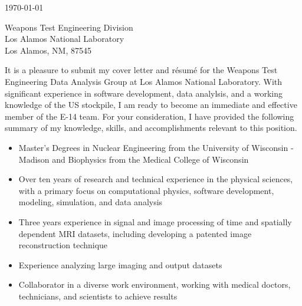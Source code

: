 
\begin{center}
\begin{minipage}{\textwidth}

  \normalsize

  \vspace{6mm} 

  \today \\
  \vspace{4mm}
	
	Weapons Test Engineering Division \\
	Los Alamos National Laboratory \\
	Los Alamos, NM, 87545 \\
  
  \vspace{4mm} 


  It is a pleasure to submit my cover letter and r\'{e}sum\'{e} for the Weapons Test Engineering Data Analysis Group at Los Alamos National Laboratory.
  With significant experience in software development, data analylsis, and a working knowledge of the US stockpile, I am ready to become an immediate and effective member of the E-14 team.
  For your consideration, I have provided the following summary of my knowledge, skills, and accomplishments relevant to this position. \\

  \begin{itemize}[leftmargin=.45in,rightmargin=.45in,itemsep=1.6mm]

	\item Master's Degrees in Nuclear Engineering from the University of Wisconsin - Madison and Biophysics from the Medical College of Wisconsin
	\item Over ten years of research and technical experience in the physical sciences, with a primary focus on computational physics, software development, modeling, simulation, and data analysis
	\item Three years experience in signal and image processing of time and spatially dependent MRI datasets, including developing a patented image reconstruction technique
	\item Experience analyzing large imaging and output datasets
	\item Collaborator in a diverse work environment, working with medical doctors, technicians, and scientists to achieve results


\end{itemize}
\end{minipage}
\end{center}

